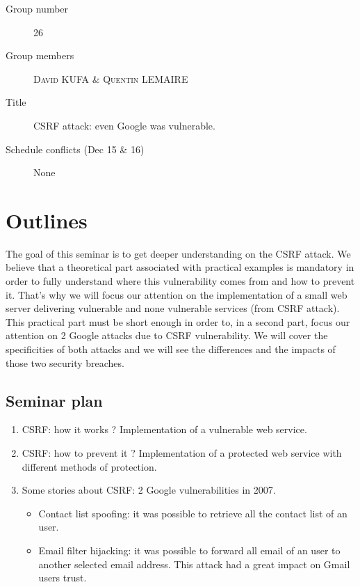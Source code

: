 \documentclass[a4paper,11pt]{article}
\begin{document}
  \begin{description}
   \item[Group number] 26
   \item[Group members] \textsc{David KUFA} \& \textsc{Quentin LEMAIRE}
   \item[Title] CSRF attack: even Google was vulnerable.
   \item[Schedule conflicts (Dec 15 \& 16)] None
  \end{description}

  \section{Outlines}
  The goal of this seminar is to get deeper understanding on the CSRF attack. We believe 
  that a theoretical part associated with practical examples is mandatory in order to fully understand 
  where this vulnerability comes from and how to prevent it. That's why we will focus our attention 
  on the implementation of a small web server delivering vulnerable and none vulnerable 
  services (from CSRF attack). This practical part must be short enough in order to, in a second part, focus our 
  attention on 2 Google attacks due to CSRF vulnerability. We will cover the specificities 
  of both attacks and we will see the differences and the impacts of those two security 
  breaches.
  
  \subsection{Seminar plan}
  
  \begin{enumerate}
   \item CSRF: how it works ? Implementation of a vulnerable web service.
   \item CSRF: how to prevent it ? Implementation of a protected web service with different methods of protection.
   \item Some stories about CSRF: 2 Google vulnerabilities in 2007.
   \begin{itemize}
    \item Contact list spoofing: it was possible to retrieve all the contact list of an user.
    \item Email filter hijacking: it was possible to forward all email of an user to another selected email address. This attack had a great impact on Gmail users trust.
   \end{itemize}
  \end{enumerate}
  
\end{document}
